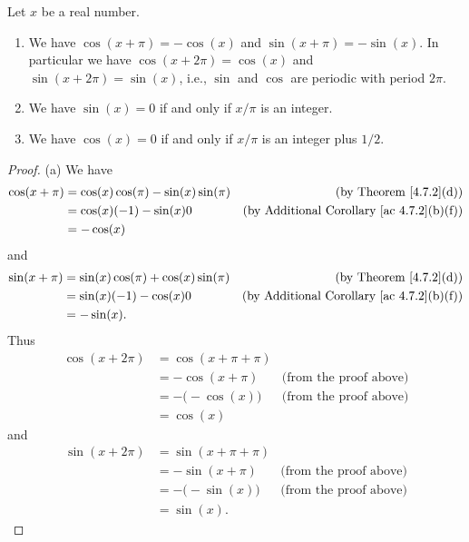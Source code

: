 \begin{theorem}\label{4.7.5}
    Let \(x\) be a real number.
    \begin{enumerate}
        \item We have \(\cos(x + \pi) = -\cos(x)\) and \(\sin(x + \pi) = -\sin(x)\).
              In particular we have \(\cos(x + 2\pi) = \cos(x)\) and \(\sin(x + 2\pi) = \sin(x)\), i.e., \(\sin\) and \(\cos\) are periodic with period \(2\pi\).
        \item We have \(\sin(x) = 0\) if and only if \(x / \pi\) is an integer.
        \item We have \(\cos(x) = 0\) if and only if \(x / \pi\) is an integer plus \(1 / 2\).
    \end{enumerate}
\end{theorem}

\begin{proof}{(a)}
    We have
    \begin{align*}
        \cos(x + \pi) & = \cos(x) \cos(\pi) - \sin(x) \sin(\pi) & \text{(by Theorem \ref{4.7.2}(d))}                    \\
                      & = \cos(x) (-1) - \sin(x) 0              & \text{(by Additional Corollary \ref{ac 4.7.2}(b)(f))} \\
                      & = -\cos(x)
    \end{align*}
    and
    \begin{align*}
        \sin(x + \pi) & = \sin(x) \cos(\pi) + \cos(x) \sin(\pi) & \text{(by Theorem \ref{4.7.2}(d))}                    \\
                      & = \sin(x) (-1) - \cos(x) 0              & \text{(by Additional Corollary \ref{ac 4.7.2}(b)(f))} \\
                      & = -\sin(x).
    \end{align*}
    Thus
    \begin{align*}
        \cos(x + 2\pi) & = \cos(x + \pi + \pi)                                 \\
                       & = -\cos(x + \pi)      & \text{(from the proof above)} \\
                       & = -\big(-\cos(x)\big) & \text{(from the proof above)} \\
                       & = \cos(x)
    \end{align*}
    and
    \begin{align*}
        \sin(x + 2\pi) & = \sin(x + \pi + \pi)                                 \\
                       & = -\sin(x + \pi)      & \text{(from the proof above)} \\
                       & = -\big(-\sin(x)\big) & \text{(from the proof above)} \\
                       & = \sin(x).
    \end{align*}
\end{proof}

